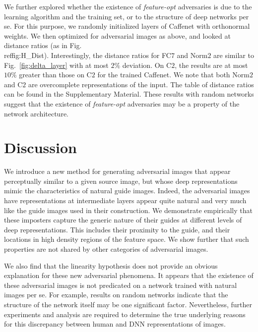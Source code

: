 \documentclass{article} %
\newcommand{\comment}[1]{}
\begin{document}
We further explored whether the existence of {\em feature-opt} adversaries
is due to the learning algorithm and the training set, or to the structure
of deep networks per se. For this purpose, we randomly initialized layers of
Caffenet with orthonormal weights.  We then optimized for adversarial images
as above, and looked at distance ratios (as in Fig.\\ref{fig:H_Dist}).
Interestingly, the distance ratios for FC$7$ and Norm$2$ are similar to
Fig.~\ref{fig:delta_layer} with at most $2\%$ deviation.  On C$2$, the results
are at most $10\%$ greater than those on C$2$ for the trained Caffenet.
We note that both Norm$2$ and C$2$ are overcomplete representations
of the input. The table of distance ratios can be found in the
Supplementary Material.
These results with random networks suggest that the existence of
{\em feature-opt} adversaries may be a property of the network architecture.

\comment{This observation shows that the model itself is vulnerable to {\em
feature-opt} adversaries, rather than just a specific trained network.}%
\section{Discussion}\vspace*{-0.1cm}

We introduce a new method for generating adversarial images that appear
perceptually similar to a given source image, but whose deep representations
mimic the characteristics of natural guide images.
Indeed, the adversarial images have representations at intermediate
layers appear quite natural and very much like the guide images used
in their construction.
We demonstrate empirically that these imposters capture the generic
nature of their guides at different levels of deep representations.  This
includes their proximity to the guide, and their locations in high density
regions of the feature space.
We show further that such properties are not shared by other
categories of adversarial images.

\comment{{{
The approach for generating adversarial images with internal representations
that mimic those of other images has worked well with a remarkably broad
class of images, including images from training and test sets, and images
of all classes in the Imagenet and Places datasets.


}}}
We also find that the linearity hypothesis \citep{GoodfellowEtalICLR2015}
does not provide an obvious explanation for these new adversarial phenomena.
It appears that the existence of these adversarial images is not predicated
on a network trained with natural images per se.  For example, results
on random networks indicate that the structure of the network itself may
be one significant factor.  Nevertheless, further experiments and analysis
are required to determine the true underlying reasons for this discrepancy
between human and DNN representations of images.
\end{document}
